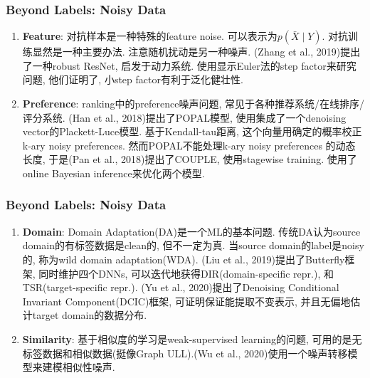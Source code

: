 \documentclass{beamer}
\newcommand{\bt}[1]{\textbf{#1}}
\begin{document}
\begin{frame}
    \frametitle{Beyond Labels: Noisy Data}

    \begin{enumerate}
        \item \bt{Feature}: 对抗样本是一种特殊的feature noise. 可以表示为$p(\bar{X} \mid Y)$. 对抗训练显然是一种主要办法. 注意随机扰动是另一种噪声. (Zhang et al., 2019)提出了一种robust ResNet, 启发于动力系统. 使用显示Euler法的step factor来研究问题, 他们证明了, 小step factor有利于泛化健壮性.
        \item \bt{Preference}: ranking中的preference噪声问题, 常见于各种推荐系统/在线排序/评分系统. (Han et al., 2018)提出了POPAL模型, 使用集成了一个denoising vector的Plackett-Luce模型. 基于Kendall-tau距离, 这个向量用确定的概率校正k-ary noisy preferences. 然而POPAL不能处理k-ary noisy preferences 的动态长度, 于是(Pan et al., 2018)提出了COUPLE, 使用stagewise training. 使用了online Bayesian inference来优化两个模型.
 
    \end{enumerate}

\end{frame}

\begin{frame}
    \frametitle{Beyond Labels: Noisy Data}

    \begin{enumerate}
        \item \bt{Domain}: Domain Adaptation(DA)是一个ML的基本问题. 传统DA认为source domain的有标签数据是clean的, 但不一定为真. 当source domain的label是noisy的, 称为wild domain adaptation(WDA). (Liu et al., 2019)提出了Butterfly框架, 同时维护四个DNNs, 可以迭代地获得DIR(domain-specific repr.), 和TSR(target-specific repr.). (Yu et al.,  2020)提出了Denoising Conditional Invariant Component(DCIC)框架, 可证明保证能提取不变表示, 并且无偏地估计target domain的数据分布.
        \item \bt{Similarity}: 基于相似度的学习是weak-supervised learning的问题, 可用的是无标签数据和相似数据(挺像Graph ULL).(Wu et al., 2020)使用一个噪声转移模型来建模相似性噪声.

    \end{enumerate}


\end{frame}
\end{document}

